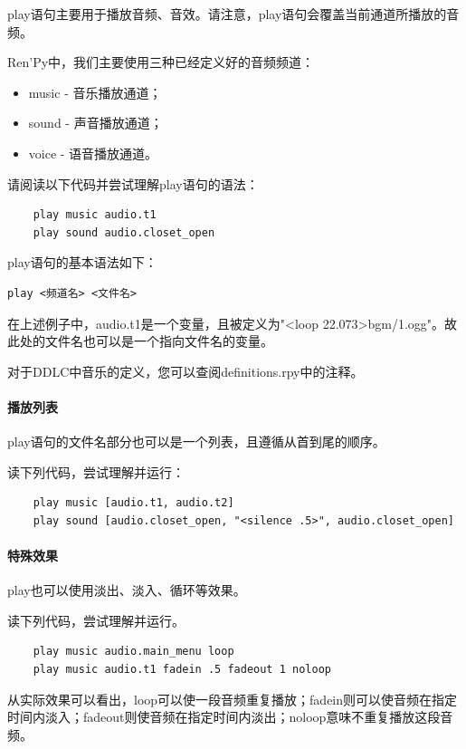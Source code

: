 \documentclass[../../Main.tex]{subfiles}
\begin{document}
play语句主要用于播放音频、音效。请注意，play语句会覆盖当前通道所播放的音频。

Ren'Py中，我们主要使用三种已经定义好的音频频道：

\begin{itemize}
    \item music - 音乐播放通道；
    \item sound - 声音播放通道；
    \item voice - 语音播放通道。 
\end{itemize}

请阅读以下代码并尝试理解play语句的语法：

\begin{lstlisting}
    play music audio.t1
    play sound audio.closet_open
\end{lstlisting}

play语句的基本语法如下：
\begin{lstlisting}[numbers=none]
play <频道名> <文件名>
\end{lstlisting}

\begin{ExtraKnowledge}
    在上述例子中，audio.t1是一个变量，且被定义为"<loop 22.073>bgm/1.ogg"。故此处的文件名也可以是一个指向文件名的变量。
\end{ExtraKnowledge}

对于DDLC中音乐的定义，您可以查阅definitions.rpy中的注释。

\paragraph{播放列表}
play语句的文件名部分也可以是一个列表，且遵循从首到尾的顺序。

读下列代码，尝试理解并运行：
\begin{lstlisting}
    play music [audio.t1, audio.t2]
    play sound [audio.closet_open, "<silence .5>", audio.closet_open]
\end{lstlisting}


\paragraph{特殊效果}
play也可以使用淡出、淡入、循环等效果。

读下列代码，尝试理解并运行。
\begin{lstlisting}
    play music audio.main_menu loop
    play music audio.t1 fadein .5 fadeout 1 noloop
\end{lstlisting}

从实际效果可以看出，loop可以使一段音频重复播放；fadein则可以使音频在指定时间内淡入；fadeout则使音频在指定时间内淡出；noloop意味不重复播放这段音频。
\end{document}

